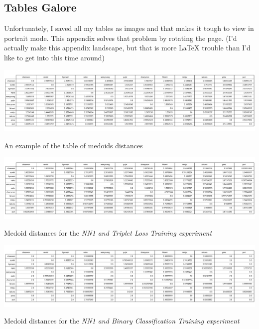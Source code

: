 \begin{landscape}
\section{Tables Galore}\label{Section:Tables-Galore}

Unfortunately, I saved all my tables as images and that makes it tough to view in portrait mode.
This appendix solves that problem by rotating the page.
(I'd actually make this appendix landscape, but that is more \LaTeX\xspace trouble than I'd like to get into this time around)

\begin{table}[h]
    \centering
    \includegraphics[width=\linewidth]{images/faceReco/medoid-table-example.png}
    \caption{An example of the table of medoids distances}
    \label{Table:Face-Recognition:method:medoid-table-example}
\end{table}

\begin{table}[h]
    \centering
    \includegraphics[width=\linewidth]{images/faceReco/nn1-and-triplet/medoid.png}
    \caption{Medoid distances for the \it{NN1 and Triplet Loss Training} experiment}
    \label{Table:Face-Recognition:Results:nn1-and-triplet-loss-medoid}
\end{table}

\begin{table}[h]
    \centering
    \includegraphics[width=\linewidth]{images/faceReco/nn1-and-binary/medoid.png}
    \caption{Medoid distances for the \it{NN1 and Binary Classification Training} experiment}
    \label{Table:Face-Recognition:Results:nn1-and-binary-medoid}
\end{table}


\end{landscape}
